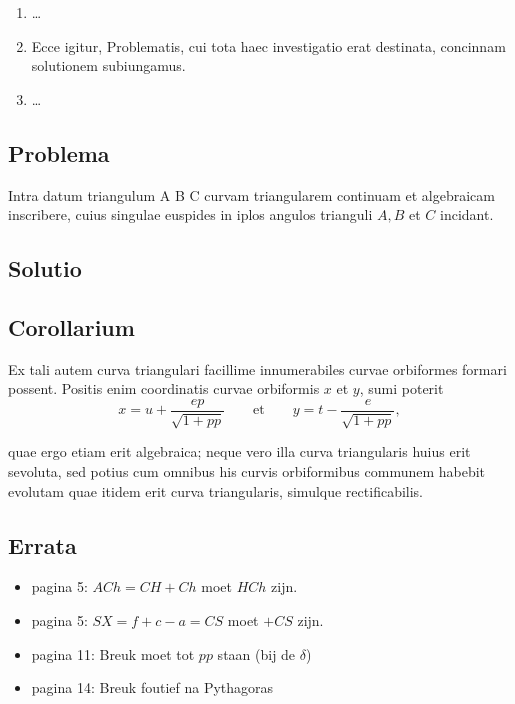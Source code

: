 \documentclass[10pt,a4paper]{article}
\newcommand{\switchenum}{\setcounter{enumi}{\arabic{enumi}-1}\switchcolumn}
\begin{document}
\begin{paracol}{2}
\begin{enumerate}[topsep=1px]
		\switchenum
		\item \ldots
		\switchcolumn*
		
		\item Ecce igitur, Problematis, cui tota haec investigatio erat destinata, concinnam solutionem subiungamus.
		
		\switchenum
		\item \ldots
		\switchcolumn*
	\end{enumerate}		


	\subsection*{Problema}
	\par Intra datum triangulum A B C curvam triangularem continuam et algebraicam inscribere, cuius singulae euspides in iplos angulos trianguli $A, B$ et $C$ incidant.
	
	\subsection*{Solutio}
	
	\subsection*{Corollarium}
	\par Ex tali autem curva triangulari facillime innumerabiles curvae orbiformes formari possent. Positis enim coordinatis curvae orbiformis $x$ et $y$, sumi poterit
	\[
		x=u+\dfrac{ep}{\sqrt{1+pp}} \qquad \text{et} \qquad y=t-\dfrac{e}{\sqrt{1+pp}},
	\]
	\par quae ergo etiam erit algebraica; neque vero illa curva triangularis huius erit sevoluta, sed potius cum omnibus his curvis orbiformibus communem  habebit evolutam quae itidem erit curva triangularis, simulque rectificabilis.

	\end{paracol}
\newpage

\subsection*{Errata}

\begin{itemize}
	\item pagina 5: $ACh = CH+Ch$ moet $HCh$ zijn.
	\item pagina 5: $SX = f+c-a = CS$ moet $+CS$ zijn.
	\item pagina 11: Breuk moet tot $pp$ staan (bij de $\delta$)
	\item pagina 14: Breuk foutief na Pythagoras
\end{itemize} 
\end{document}

